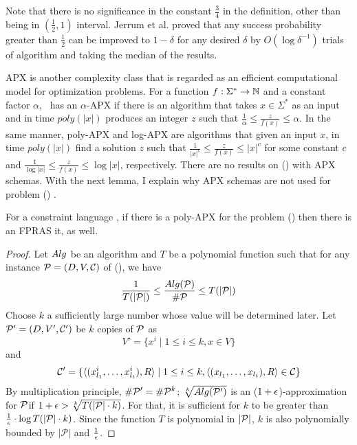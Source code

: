 Note that there is no significance in the constant \(\frac{3}{4}\) in the definition,
other than being in \((\frac{1}{2},1)\) interval. 
Jerrum et al. \cite{JVV} proved that any success probability 
greater than \(\frac{1}{2}\) can be improved to \(1-\delta\) for any desired \(\delta\) by
\(O(\log \delta^{-1})\) trials of algorithm and taking the median of the results.

APX is another complexity class that is regarded as an efficient computational model for
optimization problems.
For a function \(f:\Sigma^*\to\mathbb{N}\) and a constant factor \(\alpha\),
\mf\ has an \(\alpha\)-APX if there is an algorithm that
takes \(x\in\Sigma^*\) as an input and in time \(poly(|x|)\) produces an integer \(z\)
such that \(\frac{1}{\alpha}\le\frac{z}{f(x)}\le \alpha\). In the same manner,
poly-APX and log-APX are algorithms that given an input
\(x\), in time \(poly(|x|)\) find a solution \(z\) 
such that  \(\frac{1}{|x|^c}\le\frac{z}{f(x)}\le |x|^c\) for some constant \(c\) and
\(\frac{1}{\log |x|}\le\frac{z}{f(x)}\le \log |x|\), respectively.
There are no results on \ccsp(\mrelset) with
APX schemas. With the next lemma, I explain why APX schemas are not used for problem \ccsp(\mrelset) .

\begin{lemma}
For a constraint language \mrelset, if there is a poly-APX for
the problem \ccsp(\mrelset) then there is an FPRAS it, as well.
\end{lemma}

\begin{proof}
Let \(Alg\) be an algorithm and \(T\) be a polynomial function such
that for any instance \(\mathcal{P}=(D,V,\mathcal{C})\)
of \ccsp(\mrelset), we have 
\[\frac{1}{T(|\mathcal{P}|)} \le \frac{Alg(\mathcal{P})}{\#\mathcal{P}} \le T(|\mathcal{P}|)\]
Choose \(k\) a sufficiently large number whose value
will be determined later. Let \(\mathcal{P}'=(D, V',\mathcal{C}')\) be \(k\) copies of \(\mathcal{P}\) as
\[V'=\{x^i \mid 1 \le i \le k, x \in V\}\] and
\[\mathcal{C}'=\{\langle (x^i_{l_1},\dotsc, x^i_{l_t}), R \rangle \mid 1 \le i \le k,
\langle (x_{l_1},\dotsc, x_{l_t}), R \rangle \in \mathcal{C}\}\]
By multiplication principle, \(\#\mathcal{P}'=\#\mathcal{P}^k\); \(\sqrt[k]{Alg(\mathcal{P}')}\) is 
an (\(1+\epsilon\))-approximation for \(\mathcal{P}\)\@ if \(1+\epsilon > \sqrt[k]{T(|\mathcal{P}|\cdot k)}\)\@.
For that, it is sufficient for \(k\) to be greater than
\(\frac{1}{\epsilon}\cdot \log T(|\mathcal{P}|\cdot k)\)\@.
Since the function \(T\) is polynomial in \(|\mathcal{P}|\), \(k\) is also polynomially 
bounded by \(|\mathcal{P}|\) and \(\frac{1}{\epsilon}\)\@.
\end{proof}

